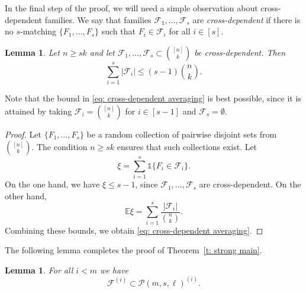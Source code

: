 \documentclass{article}
\newtheorem{lemma}[theorem]{Lemma}
\begin{document}
In the final step of the proof, we will need a simple observation about cross-dependent families. We say that families $\mathcal{F}_1, \ldots, \mathcal{F}_s$ are {\it cross-dependent} if there is no $s$-matching $\{F_1, \ldots, F_s\}$ such that $F_i \in \mathcal{F}_i$ for all $i\in [s]$.

\begin{lemma} \label{l: cross-dependent averaging}
Let $n \geq sk$ and let $\mathcal{F}_1, \ldots, \mathcal{F}_s\subset {[n]\choose k}$ be cross-dependent. Then
\begin{equation} \label{eq: cross-dependent averaging}
    \sum_{i=1}^{s}|\mathcal{F}_i| \leq (s-1){n \choose k}.
\end{equation}
\end{lemma}

Note that the bound in \eqref{eq: cross-dependent averaging} is best possible, since it is attained by taking $\mathcal{F}_i = {[n] \choose k}$ for $i\in[s-1]$ and $\mathcal{F}_s = \emptyset$.

\begin{proof}
    Let $\{F_1, \ldots, F_s\}$ be a random collection of pairwise disjoint sets from ${[n] \choose k}$. The condition $n \geq sk$ ensures that such collections exist. Let
    \[
    \xi = \sum_{i=1}^s \mathds{1}\{F_i \in \mathcal{F}_i\}.
    \]
    On the one hand, we have $\xi \leq s - 1$, since $\mathcal{F}_1, \ldots, \mathcal{F}_s$ are cross-dependent. On the other hand,
    \[
    \mathbb{E}\xi = \sum_{i=1}^s \frac{|\mathcal{F}_i|}{{n \choose k}}.
    \]
    Combining these bounds, we obtain \eqref{eq: cross-dependent averaging}.
\end{proof}





The following lemma completes the proof of Theorem~\ref{t: strong main}.

\begin{lemma} \label{l: lower layers inclusion}
    For all $i < m$ we have
    \[
    \mathcal{F}^{(i)} \subset \mathcal{P}(m, s, \ell)^{(i)}.
    \]
\end{lemma}
\end{document}
